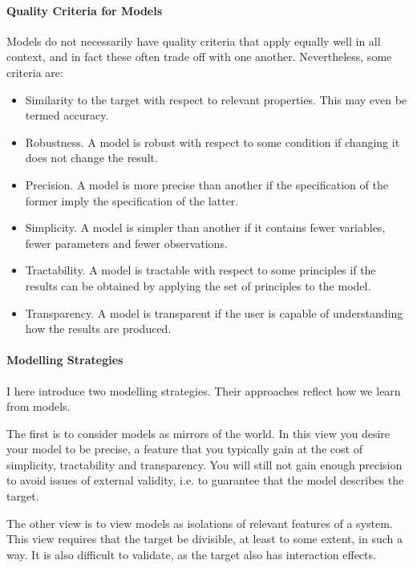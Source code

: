 \paragraph{Quality Criteria for Models}
Models do not necessarily have quality criteria that apply equally well in all context, and in fact these often trade off with one another. Nevertheless, some criteria are:
\begin{itemize}
	\item Similarity to the target with respect to relevant properties. This may even be termed accuracy.
	\item Robustness. A model is robust with respect to some condition if changing it does not change the result.
	\item Precision. A model is more precise than another if the specification of the former imply the specification of the latter.
	\item Simplicity. A model is simpler than another if it contains fewer variables, fewer parameters and fewer observations.
	\item Tractability. A model is tractable with respect to some principles if the results can be obtained by applying the set of principles to the model.
	\item Transparency. A model is transparent if the user is capable of understanding how the results are produced.
\end{itemize}

\paragraph{Modelling Strategies}
I here introduce two modelling strategies. Their approaches reflect how we learn from models.

The first is to consider models as mirrors of the world. In this view you desire your model to be precise, a feature that you typically gain at the cost of simplicity, tractability and transparency. You will still not gain enough precision to avoid issues of external validity, i.e. to guarantee that the model describes the target.

The other view is to view models as isolations of relevant features of a system. This view requires that the target be divisible, at least to some extent, in such a way. It is also difficult to validate, as the target also has interaction effects.

